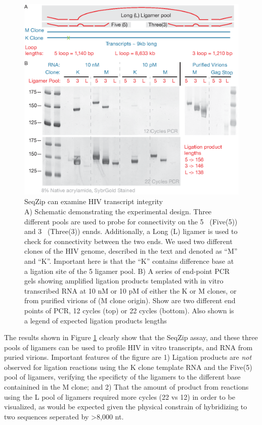 	  \begin{figure}[htbp] %
  	  \centering 
	    \includegraphics{Figures/Chapter2/HIVviaSeqZip.eps}
    	\caption[SeqZip can examine HIV transcript integrity]
    	{
	      SeqZip can examine HIV transcript integrity\\
      	A) Schematic demonstrating the experimental design. Three different pools are used to probe for connectivity on the 5\textprime~ (Five(5)) and 3\textprime~ (Three(3)) ennds. Additionally, a Long (L) ligamer is used to check for connectivity between the two ends. We used two different clones of the HIV genome, described in the text and denoted as ``M'' and ``K''. Important here is that the ``K'' contains difference base at a ligation site of the 5 ligamer pool.
        B) A series of end-point PCR gels showing amplified ligation products templated with in vitro transcribed RNA at 10 nM or 10 pM of either the K or M clones, or from purified virions of (M clone origin). Show are two different end points of PCR, 12 cycles (top) or 22 cycles (bottom). Also shown is a legend of expected ligation products lengths
    		}
    	\label{fig:Hiv tx via SeqZip}
  		\end{figure}

The results shown in Figure \ref{fig:Hiv tx via SeqZip} clearly show that the SeqZip assay, and these three pools of ligamers can be used to profile HIV in vitro transcripts, and RNA from puried virions. Important features of the figure are 1) Ligation products are \textit{not} observed for ligation reactions using the K clone template RNA and the Five(5) pool of ligamers, verifying the specificty of the ligamers to the different base containined in the M clone; and 2) That the amount of product from reactions using the L pool of ligamers required more cycles (22 vs 12) in order to be visualized, as would be expected given the physical constrain of hybridizing to two sequences seperated by >8,000 nt. 

